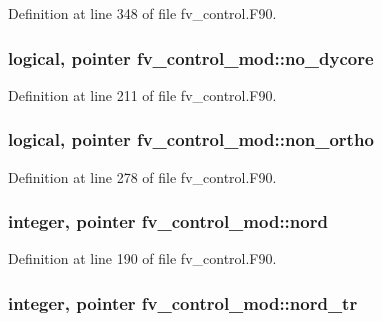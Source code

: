 Definition at line 348 of file fv\-\_\-control.\-F90.

\subsubsection[{no\-\_\-dycore}]{\setlength{\rightskip}{0pt plus 5cm}logical, pointer fv\-\_\-control\-\_\-mod\-::no\-\_\-dycore\hspace{0.3cm}{\ttfamily [private]}}\label{classfv__control__mod_af6f083211eda48e5d40ed207ccc75dac}


Definition at line 211 of file fv\-\_\-control.\-F90.

\subsubsection[{non\-\_\-ortho}]{\setlength{\rightskip}{0pt plus 5cm}logical, pointer fv\-\_\-control\-\_\-mod\-::non\-\_\-ortho\hspace{0.3cm}{\ttfamily [private]}}\label{classfv__control__mod_a43435c908837a24797feeda4b6299c85}


Definition at line 278 of file fv\-\_\-control.\-F90.

\subsubsection[{nord}]{\setlength{\rightskip}{0pt plus 5cm}integer, pointer fv\-\_\-control\-\_\-mod\-::nord\hspace{0.3cm}{\ttfamily [private]}}\label{classfv__control__mod_ab04c00bf38a9bb2111f7787ad1d92be0}


Definition at line 190 of file fv\-\_\-control.\-F90.

\subsubsection[{nord\-\_\-tr}]{\setlength{\rightskip}{0pt plus 5cm}integer, pointer fv\-\_\-control\-\_\-mod\-::nord\-\_\-tr\hspace{0.3cm}{\ttfamily [private]}}\label{classfv__control__mod_a68ec2562c9db66671c7d7b4cbd3d88b8}



